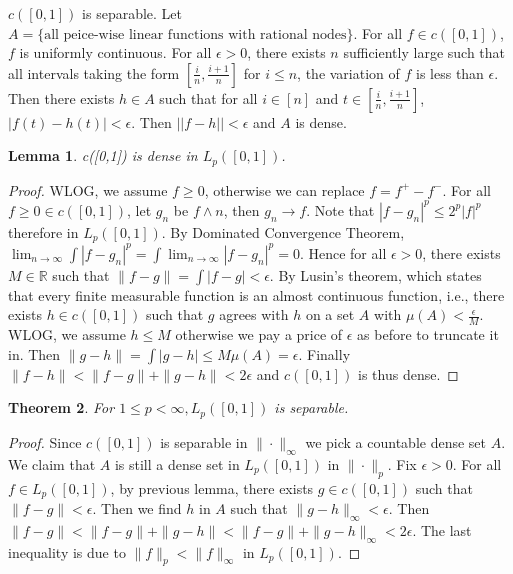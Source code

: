 \documentclass[a4paper, 11pt]{article}
\newcommand{\R}{\mathbb{R}}
\newtheorem{theorem}{Theorem}[section]
\newtheorem{lemma}[theorem]{Lemma}
\theoremstyle{definition}
\begin{document}
$c([0,1])$ is separable. Let $A=\{\text{all peice-wise linear functions with rational nodes}\}$. For all $f \in c([0,1])$, $f$ is uniformly continuous. For all $\epsilon>0$, 
there exists $n$ sufficiently large such that all intervals taking the form $[\frac{i}{n}, \frac{i+1}{n}]$ for $i\le n$, the variation of $f$ is less than $\epsilon$.
Then there exists $h\in A$ such that for all $i\in [n]$ and $t\in [\frac{i}{n}, \frac{i+1}{n}]$, $|f(t)-h(t)|<\epsilon$. Then $||f-h||<\epsilon$ and $A$ is dense.
\begin{lemma}
    c([0,1]) is dense in $L_p([0,1])$. 
\end{lemma}
\begin{proof}
    WLOG, we assume $f\ge 0$, otherwise we can replace $f=f^+-f^-$. For all $f\ge 0\in c([0,1])$, let $g_n$ be $f\land n$, then $g_n\to f$.
    Note that $|f-g_n|^p\le 2^p|f|^p$ therefore in $L_p([0,1])$. By Dominated Convergence Theorem, $\lim_{n\to \infty}\int |f-g_n|^p = \int \lim_{n\to \infty}|f-g_n|^p=0$. 
    Hence for all $\epsilon>0$, there exists $M\in \R$ such that $\|f-g\|=\int |f-g|<\epsilon$. By Lusin's theorem, which states that every finite measurable function is an almost 
    continuous function, i.e., there exists $h \in c([0,1])$ such that $g$ agrees with $h$ on a set $A$ with $\mu(A)<\frac{\epsilon}{M}$. WLOG, we assume $h\le M$ otherwise we 
    pay a price of $\epsilon$ as before to truncate it in. Then $\|g-h\|=\int |g-h|\le M\mu(A)=\epsilon$. Finally $\|f-h\|<\|f-g\|+\|g-h\|<2\epsilon$ and $c([0,1])$ is thus dense.
\end{proof}
\begin{theorem}
    For $1\le p <\infty, L_p([0,1])$ is separable.
\end{theorem}
\begin{proof}
    Since $c([0,1])$ is separable in $\|\cdot\|_\infty$ we pick a countable dense set $A$. We claim that $A$ is still a dense set in $L_p([0,1])$ in $\|\cdot\|_p$. 
    Fix $\epsilon>0$. For all $f \in L_p([0,1])$, by previous lemma, there exists  $g \in c([0,1])$ such that $\|f-g\|<\epsilon$. Then we find $h$ in $A$ such that $\|g-h\|_\infty<\epsilon$.
    Then $\|f-g\|<\|f-g\|+\|g-h\|<\|f-g\|+\|g-h\|_\infty<2\epsilon$. The last inequality is due to $\|f\|_p<\|f\|_\infty$ in $L_p([0,1])$.
\end{proof}
\end{document}
